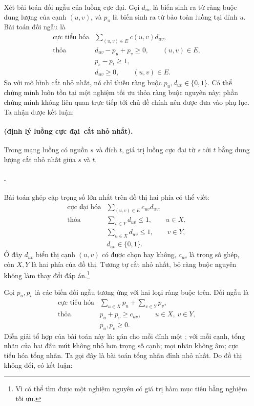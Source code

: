 \documentclass[11pt]{article}
\begin{document}
Xét bài toán đối ngẫu của luồng cực đại. Gọi \(d_{uv}\) là biến sinh ra từ
ràng buộc dung lượng của cạnh \((u,v)\), và \(p_u\) là biến sinh ra từ bảo
toàn luồng tại đỉnh \(u\). Bài toán đối ngẫu là
\[
\begin{array}{ll}
\text{cực tiểu hóa} & \displaystyle \sum_{(u,v)\in E}c(u,v)d_{uv},\\
\text{thỏa} & d_{uv}-p_u+p_v\ge 0,\qquad (u,v)\in E,\\
& p_s-p_t\ge 1,\\
& d_{uv}\ge 0,\qquad (u,v)\in E.
\end{array}
\]
So với mô hình cắt nhỏ nhất, nó chỉ thiếu ràng buộc \(p_u,d_{uv}\in\{0,1\}\).
Có thể chứng minh luôn tồn tại một nghiệm tối ưu thỏa ràng buộc nguyên này;
phần chứng minh không liên quan trực tiếp tới chủ đề chính nên được đưa vào
phụ lục. Ta nhận được kết luận:

\paragraph{ (định lý luồng cực đại--cắt nhỏ nhất).}
Trong mạng luồng có nguồn \(s\) và đích \(t\), giá trị luồng cực đại từ
\(s\) tới \(t\) bằng dung lượng cắt nhỏ nhất giữa \(s\) và \(t\).

\paragraph{.}
Bài toán ghép cặp trọng số lớn nhất trên đồ thị hai phía có thể viết:
\[
\begin{array}{ll}
\text{cực đại hóa} & \displaystyle \sum_{(u,v)\in E}c_{uv}d_{uv},\\
\text{thỏa} & \displaystyle \sum_{v\in Y}d_{uv}\le 1,\qquad u\in X,\\
& \displaystyle \sum_{u\in X}d_{uv}\le 1,\qquad v\in Y,\\
& d_{uv}\in\{0,1\}.
\end{array}
\]
Ở đây \(d_{uv}\) biểu thị cạnh \((u,v)\) có được chọn hay không, \(c_{uv}\) là
trọng số ghép, còn \(X,Y\) là hai phía của đồ thị. Tương tự cắt nhỏ nhất, bỏ
ràng buộc nguyên không làm thay đổi đáp án.\footnote{Vì có thể tìm được một
nghiệm nguyên có giá trị hàm mục tiêu bằng nghiệm tối ưu.}

Gọi \(p_u,p_v\) là các biến đối ngẫu tương ứng với hai loại ràng buộc trên.
Đối ngẫu là
\[
\begin{array}{ll}
\text{cực tiểu hóa} & \displaystyle \sum_{u\in X}p_u+\sum_{v\in Y}p_v,\\
\text{thỏa} & p_u+p_v\ge c_{uv},\qquad u\in X,\ v\in Y,\\
& p_u,p_v\ge 0.
\end{array}
\]
Diễn giải tổ hợp của bài toán này là: gán cho mỗi đỉnh một ;
với mỗi cạnh, tổng nhãn của hai đầu mút không nhỏ hơn trọng số cạnh; mọi nhãn
không âm; cực tiểu hóa tổng nhãn. Ta gọi đây là bài toán tổng nhãn đỉnh nhỏ
nhất. Do đồ thị không đổi, có kết luận:
\end{document}
